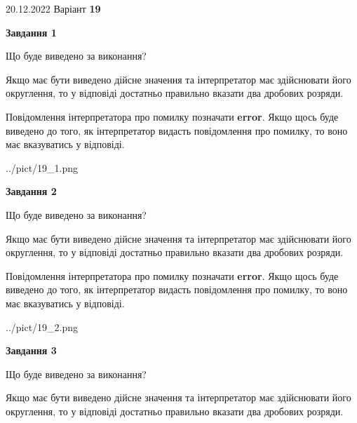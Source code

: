 \documentclass[12pt, ukrainian]{article}
\begin{document}
{20.12.2022 Варіант \No \textbf { 19 }\par}
{
\begin {Large}

{\begin {center}\textbf{Завдання 1}\end {center}}\par
Що буде виведено за виконання? \par

Якщо має бути виведено дійсне значення та інтерпретатор має здійснювати його округлення, 
то у відповіді достатньо правильно вказати два дробових розряди.

Повідомлення інтерпретатора про помилку позначати \textbf{error}.
Якщо щось буде виведено до того, як інтерпретатор видасть повідомлення про помилку, 
то воно має вказуватись у відповіді. \par

\begin{center}
	{../pict/19_1.png}
\end{center}
\newpage

{\begin {center}\textbf{Завдання 2}\end {center}}\par
Що буде виведено за виконання? \par

Якщо має бути виведено дійсне значення та інтерпретатор має здійснювати його округлення, 
то у відповіді достатньо правильно вказати два дробових розряди.

Повідомлення інтерпретатора про помилку позначати \textbf{error}.
Якщо щось буде виведено до того, як інтерпретатор видасть повідомлення про помилку, 
то воно має вказуватись у відповіді. \par

\begin{center}
	{../pict/19_2.png}
\end{center}
\newpage

{\begin {center}\textbf{Завдання 3}\end {center}}\par
Що буде виведено за виконання? \par

Якщо має бути виведено дійсне значення та інтерпретатор має здійснювати його округлення, 
то у відповіді достатньо правильно вказати два дробових розряди.


\end{Large}}
\end{document}
